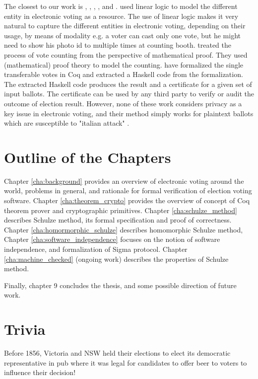  The closest to our work is \cite{DeYoung:2012:LLV}, \cite{Pattinson:2015:VCM}, \cite{Pattinson:2016:MSP},
 \cite{Verity:2017:FVI:3014812.3014845}, and \cite{Ghale:2017:FVS}.  \cite{DeYoung:2012:LLV} 
 used linear logic\citep{GIRARD19871} to model the different entity in electronic voting as a resource. 
 The use of linear logic makes it very natural to capture the different entities in electronic voting,  
 depending on their usage, by means of modality e.g. a voter can cast only one vote, but he might 
 need to show his photo id to multiple times at counting booth. \cite{Pattinson:2015:VCM} treated 
 the process of vote counting from
 the perspective of mathematical proof. They used (mathematical) proof theory to model the 
 counting. \cite{Ghale:2017:FVS} have formalized the single transferable votes in Coq and 
 extracted a Haskell code from the formalization. The extracted Haskell code produces the result 
 and a certificate for a given set of input ballots. The certificate can be used by any third party to verify 
 or audit the outcome of election result.  However, none of these work considers privacy as a key 
 issue in electronic voting, and their method simply works for plaintext ballots which are  susceptible to 
 "italian attack"  \citep{Otten}   \citep{Benaloh:2009:SSC}.

\section{Outline of the Chapters}
Chapter \ref{cha:background} provides an overview of electronic voting around the world, 
problems in general, and rationale for formal verification of election voting software. 
Chapter \ref{cha:theorem_crypto} provides the overview of concept of 
Coq theorem prover  and cryptographic primitives. Chapter \ref{cha:schulze_method} 
describes Schulze method, its formal specification and proof of correctness. 
Chapter \ref{cha:homormorphic_schulze} describes homomorphic Schulze method, 
Chapter \ref{cha:software_independence} focuses on the notion of software independence, and 
formalization of  
Sigma protocol. Chapter \ref{cha:machine_checked} (ongoing work) describes the 
properties of Schulze method. 

Finally, chapter 9 concludes the thesis, and some possible direction of future work. 



\section{Trivia}
 Before 1856, Victoria and NSW held their elections to elect its 
	  democratic representative in pub where it was legal for 
	  candidates to offer beer to voters to influence their 
	  decision! 
	  
